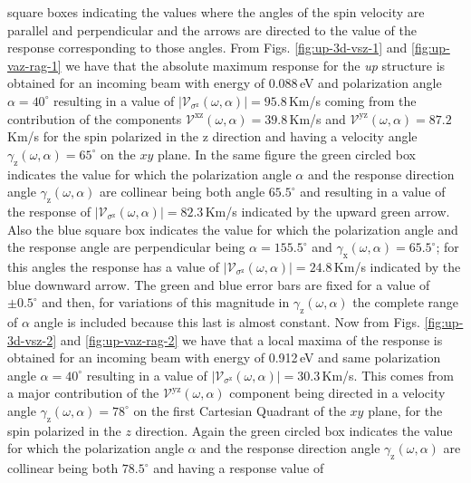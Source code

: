 \documentclass[prb,11pt,tightenlines,twocolumn,aps]{revtex4-1}
\begin{document}
square boxes indicating the values where the angles of the spin velocity are
parallel and perpendicular and the arrows are directed to the value of the
response corresponding to those angles.
% 
From Figs. \ref{fig:up-3d-vsz-1} and \ref{fig:up-vaz-rag-1} we have that the
absolute maximum response for the \emph{up} structure is obtained for an
incoming beam with energy of 0.088\,eV and polarization angle
$\alpha=40^{\circ}$ resulting in a value of
$|\mathcal{V}_{\sigma^{\mathrm{z}}}(\omega,\alpha)|=95.8$\,Km/s coming from the
contribution of the components
$\mathcal{V}^{\mathrm{xz}}(\omega,\alpha)=39.8$\,Km/s and
$\mathcal{V}^{\mathrm{yz}}(\omega,\alpha)=87.2$\,Km/s for the spin polarized in
the $\mathrm{z}$ direction and having a velocity angle
$\gamma_{\mathrm{z}}(\omega,\alpha)=65^{\circ}$ on the $xy$ plane.
% 
In the same figure the green circled box indicates the value for which the
polarization angle $\alpha$ and the response direction angle
$\gamma_{\mathrm{z}}(\omega,\alpha)$ are collinear being both angle
$65.5^{\circ}$ and resulting in a value of the response of
$|\mathcal{V}_{\sigma^{\mathrm{z}}}(\omega,\alpha)|=82.3$\,Km/s indicated by the
upward green arrow.
% 
Also the blue square box indicates the value for which the polarization angle
and the response angle are perpendicular being $\alpha=155.5^{\circ}$ and
$\gamma_{\mathrm{x}}(\omega,\alpha)=65.5^{\circ}$; for this angles the response
has a value of $|\mathcal{V}_{\sigma^{\mathrm{z}}}(\omega,\alpha)|=24.8$\,Km/s
indicated by the blue downward arrow.
% 
The green and blue error bars are fixed for a value of $\pm0.5^{\circ}$ and
then, for variations of this magnitude in $\gamma_{\mathrm{z}}(\omega,\alpha)$
the complete range of $\alpha$ angle is included because this last is almost
constant.
% 
Now from Figs. \ref{fig:up-3d-vsz-2} and \ref{fig:up-vaz-rag-2} we have that a
local maxima of the response is obtained for an incoming beam with energy of
0.912\,eV and same polarization angle $\alpha=40^{\circ}$ resulting in a value
of $|\mathcal{V}_{\sigma^{\mathrm{z}}}(\omega,\alpha)|=30.3$\,Km/s. This comes
from a major contribution of the $\mathcal{V}^{\mathrm{yz}}(\omega,\alpha)$
component being directed in a velocity angle
$\gamma_{\mathrm{z}}(\omega,\alpha)=78^{\circ}$ on the first Cartesian Quadrant
of the $xy$ plane, for the spin polarized in the $z$ direction.
% 
Again the green circled box indicates the value for which the polarization angle
$\alpha$ and the response direction angle $\gamma_{\mathrm{z}}(\omega,\alpha)$
are collinear being both $78.5^{\circ}$ and having a response value of
\end{document}
